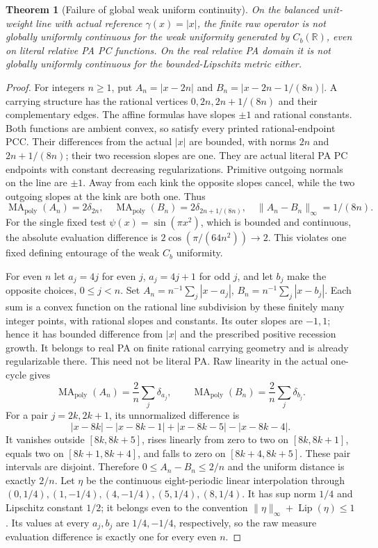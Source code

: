 \documentclass[11pt]{article}
\newtheorem{theorem}{Theorem}
\newcommand{\R}{\mathbb R}
\newcommand{\MA}{\operatorname{MA}_{\mathrm{poly}}}
\begin{document}
\begin{theorem}[Failure of global weak uniform continuity]\label{uniform-failure}
On the balanced unit-weight line with actual reference $\gamma(x)=|x|$,
the finite raw operator is not globally uniformly continuous for the weak
uniformity generated by $C_b(\R)$, even on literal relative PA PC functions.
On the real relative PA domain it is not globally uniformly continuous
for the bounded-Lipschitz metric either.
\end{theorem}
\begin{proof}
For integers $n\geq1$, put $A_n=|x-2n|$ and
$B_n=|x-2n-1/(8n)|$. A carrying structure has the rational vertices
$0,2n,2n+1/(8n)$ and their complementary edges. The affine formulas
have slopes $\pm1$ and rational constants. Both functions are ambient
convex, so satisfy every printed rational-endpoint PCC. Their differences
from the actual $|x|$ are bounded, with norms $2n$ and $2n+1/(8n)$;
their two recession slopes are one. They are actual literal PA PC
endpoints with constant decreasing regularizations. Primitive outgoing
normals on the line are $\pm1$. Away from each kink the opposite slopes
cancel, while the two outgoing slopes at the kink are both one. Thus
\[
 \MA(A_n)=2\delta_{2n},\quad \MA(B_n)=2\delta_{2n+1/(8n)},\quad
 \|A_n-B_n\|_\infty=1/(8n).
\]
For the single fixed test $\psi(x)=\sin(\pi x^2)$, which is bounded
and continuous, the absolute evaluation difference is
$2\cos(\pi/(64n^2))\to2$. This violates one fixed defining entourage
of the weak $C_b$ uniformity.

For even $n$ let $a_j=4j$ for even $j$, $a_j=4j+1$ for odd $j$,
and let $b_j$ make the opposite choices, $0\leq j<n$. Set
$A_n=n^{-1}\sum_j|x-a_j|$, $B_n=n^{-1}\sum_j|x-b_j|$.
Each sum is a convex function on the rational line subdivision by these
finitely many integer points, with rational slopes and constants. Its
outer slopes are $-1,1$; hence it has bounded difference from $|x|$
and the prescribed positive recession growth. It belongs to real PA on
finite rational carrying geometry and is already regularizable there.
This need not be literal PA. Raw linearity in the actual one-cycle gives
\[
 \MA(A_n)=\frac2n\sum_j\delta_{a_j},\qquad
 \MA(B_n)=\frac2n\sum_j\delta_{b_j}.
\]
For a pair $j=2k,2k+1$, its unnormalized difference is
\[
 |x-8k|-|x-8k-1|+|x-8k-5|-|x-8k-4|.
\]
It vanishes outside $[8k,8k+5]$, rises linearly from zero to two
on $[8k,8k+1]$, equals two on $[8k+1,8k+4]$, and falls to zero
on $[8k+4,8k+5]$. These pair intervals are disjoint. Therefore
$0\leq A_n-B_n\leq2/n$ and the uniform distance is exactly $2/n$.
Let $\eta$ be the continuous eight-periodic linear interpolation through
$(0,1/4),(1,-1/4),(4,-1/4),(5,1/4),(8,1/4)$.
It has sup norm $1/4$ and Lipschitz constant $1/2$; it belongs even
to the convention $\|\eta\|_\infty+\operatorname{Lip}(\eta)\leq1$.
Its values at every $a_j,b_j$ are $1/4,-1/4$, respectively, so the
raw measure evaluation difference is exactly one for every even $n$.


\end{proof}
\end{document}
